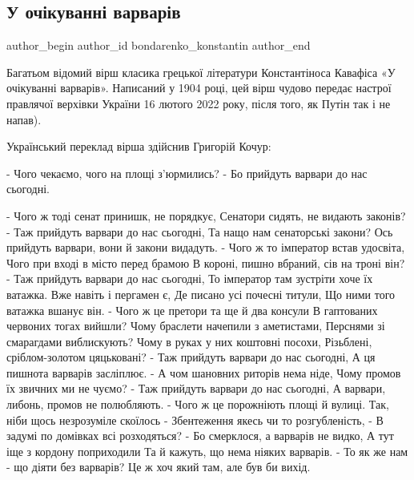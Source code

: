  
 
 
 
 
 
\subsection{У очікуванні варварів}
\label{sec:16_02_2022.fb.bondarenko_konstantin.1.u_ochikuvanni_varvariv}
 
\ifcmt
 author_begin
   author_id bondarenko_konstantin
 author_end
\fi

Багатьом відомий вірш класика грецької літератури Константіноса Кавафіса «У
очікуванні варварів». Написаний у 1904 році, цей вірш чудово передає настрої
правлячої верхівки України 16 лютого 2022 року, після того, як Путін так і не
напав).

Український переклад вірша здійснив Григорій Кочур:

- Чого чекаємо, чого на площі з'юрмились? - Бо прийдуть варвари до нас
сьогодні.

\obeycr
- Чого ж тоді сенат принишк, не порядкує,
Сенатори сидять, не видають законів? -
Таж прийдуть варвари до нас сьогодні,
Та нащо нам сенаторські закони?
Ось прийдуть варвари, вони й закони видадуть.
- Чого ж то імператор встав удосвіта,
Чого при вході в місто перед брамою
В короні, пишно вбраний, сів на троні він? -
Таж прийдуть варвари до нас сьогодні,
То імператор там зустріти хоче їх ватажка. 
Вже навіть і пергамен є,
Де писано усі почесні титули,
Що ними того ватажка вшанує він.
- Чого ж це претори та ще й два консули
В гаптованих червоних тогах вийшли?
Чому браслети начепили з аметистами,
Перснями зі смарагдами виблискують?
Чому в руках у них коштовні посохи,
Різьблені, сріблом-золотом цяцьковані? -
Таж прийдуть варвари до нас сьогодні,
А ця пишнота варварів засліплює.
- А чом шановних риторів нема ніде,
Чому промов їх звичних ми не чуємо? -
Таж прийдуть варвари до нас сьогодні,
А варвари, либонь, промов не полюбляють.
- Чого ж це порожніють площі й вулиці.
Так, ніби щось незрозуміле скоїлось -
Збентеження якесь чи то розгубленість, -
В задумі по домівках всі розходяться? -
Бо смерклося, а варварів не видко,
А тут іще з кордону поприходили
Та й кажуть, що нема ніяких варварів.
- То як же нам - що діяти без варварів?
Це ж хоч який там, але був би вихід.
\restorecr
